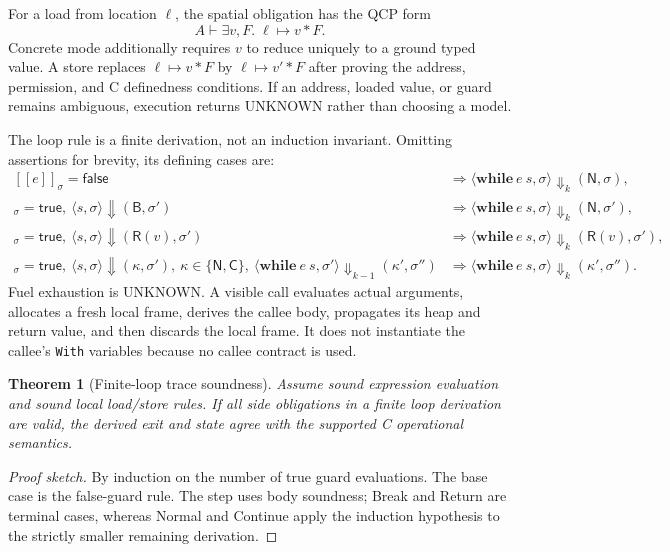\documentclass[10pt]{article}
\newtheorem{theorem}{Theorem}
\newcommand{\unknown}{\textsf{UNKNOWN}}
\newcommand{\sem}[1]{[\![ #1 ]\!]}
\newcommand{\pto}{\mathrel{\mapsto}}
\begin{document}
For a load from location $\ell$, the spatial obligation has the QCP form
\[
  A\vdash\exists v,F.\;\ell\pto v * F.
\]
Concrete mode additionally requires $v$ to reduce uniquely to a ground typed
value.  A store replaces $\ell\pto v*F$ by $\ell\pto v'*F$ after proving the
address, permission, and C definedness conditions.  If an address, loaded
value, or guard remains ambiguous, execution returns \unknown{} rather than
choosing a model.

The loop rule is a finite derivation, not an induction invariant.  Omitting
assertions for brevity, its defining cases are:
\[
\begin{array}{ll}
\sem{e}_\sigma=\mathsf{false}
  &\Rightarrow
    \langle\mathbf{while}\ e\ s,\sigma\rangle
      \Downarrow_k(\mathsf N,\sigma),\\
\sem{e}_\sigma=\mathsf{true},\
  \langle s,\sigma\rangle\Downarrow(\mathsf B,\sigma')
  &\Rightarrow
    \langle\mathbf{while}\ e\ s,\sigma\rangle
      \Downarrow_k(\mathsf N,\sigma'),\\
\sem{e}_\sigma=\mathsf{true},\
  \langle s,\sigma\rangle\Downarrow(\mathsf R(v),\sigma')
  &\Rightarrow
    \langle\mathbf{while}\ e\ s,\sigma\rangle
      \Downarrow_k(\mathsf R(v),\sigma'),\\
\sem{e}_\sigma=\mathsf{true},\
  \langle s,\sigma\rangle\Downarrow(\kappa,\sigma'),\
  \kappa\in\{\mathsf N,\mathsf C\},\
  \langle\mathbf{while}\ e\ s,\sigma'\rangle
      \Downarrow_{k-1}(\kappa',\sigma'')
  &\Rightarrow
    \langle\mathbf{while}\ e\ s,\sigma\rangle
      \Downarrow_k(\kappa',\sigma'').
\end{array}
\]
Fuel exhaustion is \unknown{}.  A visible call evaluates actual arguments,
allocates a fresh local frame, derives the callee body, propagates its heap and
return value, and then discards the local frame.  It does not instantiate the
callee's \texttt{With} variables because no callee contract is used.

\begin{theorem}[Finite-loop trace soundness]
Assume sound expression evaluation and sound local load/store rules.  If all
side obligations in a finite loop derivation are valid, the derived exit and
state agree with the supported C operational semantics.
\end{theorem}
\begin{proof}[Proof sketch]
By induction on the number of true guard evaluations.  The base case is the
false-guard rule.  The step uses body soundness; Break and Return are terminal
cases, whereas Normal and Continue apply the induction hypothesis to the
strictly smaller remaining derivation.
\end{proof}
\end{document}

